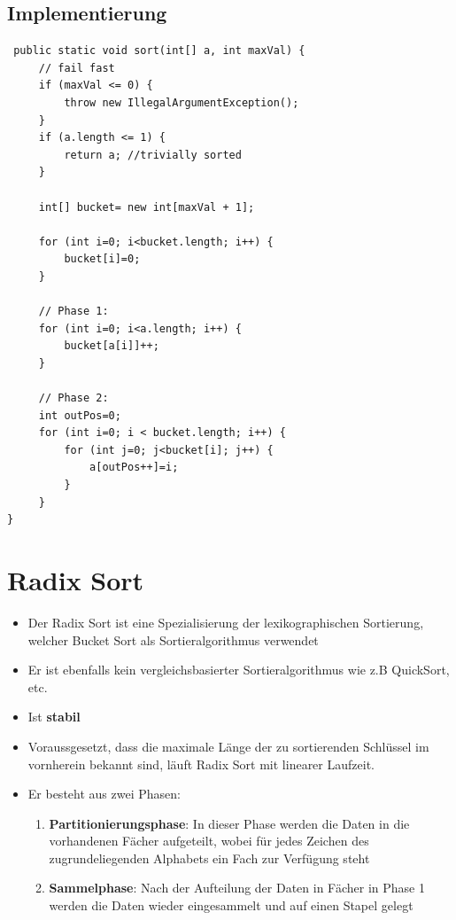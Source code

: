 \clearpage

\subsection{Implementierung}
\begin{lstlisting}
 public static void sort(int[] a, int maxVal) {
	 // fail fast
	 if (maxVal <= 0) {
		 throw new IllegalArgumentException();
	 }
	 if (a.length <= 1) {
		 return a; //trivially sorted
	 }
 
	 int[] bucket= new int[maxVal + 1];
	
	 for (int i=0; i<bucket.length; i++) {
		 bucket[i]=0;
	 }
	
	 // Phase 1:
	 for (int i=0; i<a.length; i++) {
		 bucket[a[i]]++;
	 }
	
	 // Phase 2: 
	 int outPos=0;
	 for (int i=0; i < bucket.length; i++) {
		 for (int j=0; j<bucket[i]; j++) {
			 a[outPos++]=i;
		 }
	 }
}
\end{lstlisting}

\clearpage


\section{Radix Sort}
\begin{itemize}
	\item Der Radix Sort ist eine Spezialisierung der lexikographischen Sortierung, welcher Bucket Sort als Sortieralgorithmus verwendet
	\item Er ist ebenfalls kein vergleichsbasierter Sortieralgorithmus wie z.B QuickSort, etc.
	\item Ist \textbf{stabil}
	\item Voraussgesetzt, dass die maximale Länge der zu sortierenden Schlüssel im vornherein bekannt sind, läuft Radix Sort mit linearer Laufzeit.
	\item Er besteht aus zwei Phasen:
	\begin{enumerate}
		\item \textbf{Partitionierungsphase}: In dieser Phase werden die Daten in die vorhandenen Fächer aufgeteilt, wobei für jedes Zeichen des zugrundeliegenden Alphabets ein Fach zur Verfügung steht
		\item \textbf{Sammelphase}: Nach der Aufteilung der Daten in Fächer in Phase 1 werden die Daten wieder eingesammelt und auf einen Stapel gelegt
	\end{enumerate}
\end{itemize}

